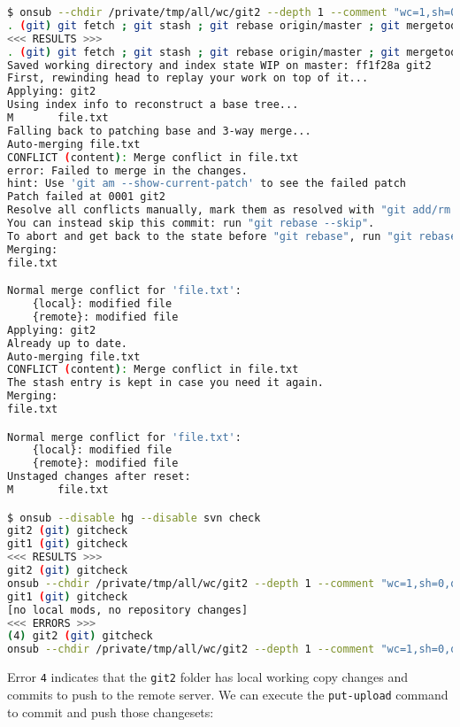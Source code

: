 \begin{snugshade}
\begin{lstlisting}[language=bash]	
$ onsub --chdir /private/tmp/all/wc/git2 --depth 1 --comment "wc=1,sh=0,out=1,in=1" {download-get}
. (git) git fetch ; git stash ; git rebase origin/master ; git mergetool -y --tool=kdiff3 ; git rebase --continue ; git merge origin/master ; git stash pop ; git mergetool -y --tool=kdiff3 ; git reset --mixed ; git stash clear
<<< RESULTS >>>
. (git) git fetch ; git stash ; git rebase origin/master ; git mergetool -y --tool=kdiff3 ; git rebase --continue ; git merge origin/master ; git stash pop ; git mergetool -y --tool=kdiff3 ; git reset --mixed ; git stash clear
Saved working directory and index state WIP on master: ff1f28a git2
First, rewinding head to replay your work on top of it...
Applying: git2
Using index info to reconstruct a base tree...
M       file.txt
Falling back to patching base and 3-way merge...
Auto-merging file.txt
CONFLICT (content): Merge conflict in file.txt
error: Failed to merge in the changes.
hint: Use 'git am --show-current-patch' to see the failed patch
Patch failed at 0001 git2
Resolve all conflicts manually, mark them as resolved with "git add/rm <conflicted_files>", then run "git rebase --continue".
You can instead skip this commit: run "git rebase --skip".
To abort and get back to the state before "git rebase", run "git rebase --abort".
Merging:
file.txt

Normal merge conflict for 'file.txt':
	{local}: modified file
	{remote}: modified file
Applying: git2
Already up to date.
Auto-merging file.txt
CONFLICT (content): Merge conflict in file.txt
The stash entry is kept in case you need it again.
Merging:
file.txt

Normal merge conflict for 'file.txt':
	{local}: modified file
	{remote}: modified file
Unstaged changes after reset:
M       file.txt

$ onsub --disable hg --disable svn check
git2 (git) gitcheck
git1 (git) gitcheck
<<< RESULTS >>>
git2 (git) gitcheck
onsub --chdir /private/tmp/all/wc/git2 --depth 1 --comment "wc=1,sh=0,out=1,in=0" {put-upload}
git1 (git) gitcheck
[no local mods, no repository changes]
<<< ERRORS >>>
(4) git2 (git) gitcheck
onsub --chdir /private/tmp/all/wc/git2 --depth 1 --comment "wc=1,sh=0,out=1,in=0" {put-upload}
\end{lstlisting}
\end{snugshade}

Error \lstinline{4} indicates that the \lstinline{git2} folder has local working copy changes and commits to push to the remote server. We can execute the \lstinline{put-upload} command to commit and push those changesets:

